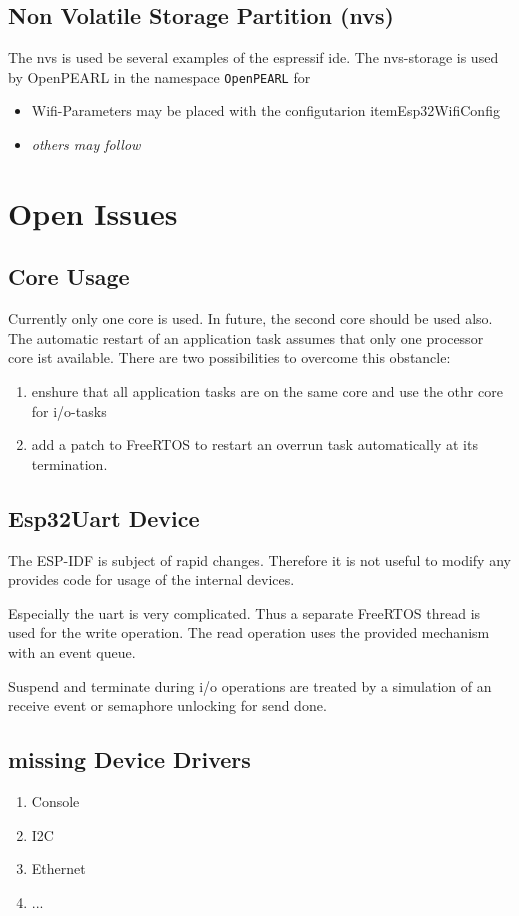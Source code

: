 \subsection{Non Volatile Storage Partition (nvs)}
The nvs is used be several examples of the espressif ide. 
The nvs-storage is used by OpenPEARL in the namespace \texttt{OpenPEARL} for
\begin{itemize}
\item Wifi-Parameters may be placed with the configutarion itemEsp32WifiConfig
\item \textit{others may follow}
\end{itemize}




\section{Open Issues}
\subsection{Core Usage}
Currently only one core is used.
In future, the second core should be used also.
The automatic restart of an application task assumes that only one processor core ist 
available.
There are two possibilities to overcome this obstancle:
\begin{enumerate}
\item enshure that all application tasks are on the same core and use the othr core for i/o-tasks
\item add a patch to FreeRTOS to restart an overrun task automatically at its termination.
\end{enumerate}

\subsection{Esp32Uart Device}
The ESP-IDF is subject of rapid changes. Therefore it is not 
useful to modify any provides code for usage of the internal devices.

Especially the uart is very complicated. Thus a separate FreeRTOS thread 
is used for the write operation. The read operation uses the 
provided mechanism with an event queue.

Suspend and terminate during i/o operations are treated by a simulation
of an receive event or semaphore unlocking for send done.


\subsection{missing Device Drivers}
\begin{enumerate}
\item Console
\item I2C
\item Ethernet
\item ...
\end{enumerate}


